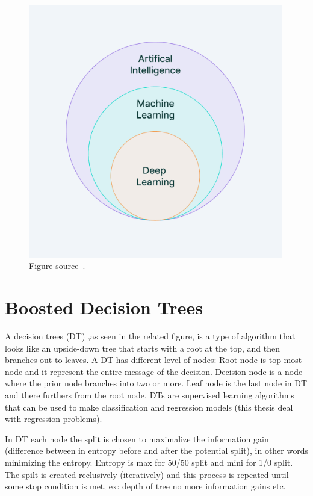 \begin{figure}[t!]
\centering
\includegraphics[width=0.99\textwidth]{figures/ML_diagram.png}
\caption[ML and AI]{Figure source~\cite{SMtable}.}
\label{fig:ML_diagram}
\end{figure}
  
\section{Boosted Decision Trees}
A decision trees (DT) ,as seen in the related figure, is a type of algorithm that looks like an upside-down tree that starts with a root at the top, and then branches out to leaves. A DT has different level of nodes: Root node is top most node and it represent the entire message of the decision. Decision node is a node where the prior node branches into two or more. Leaf node is the last node in DT and there furthers from the root node. DTs are supervised learning algorithms that can be used to make classification and regression models (this thesis deal with regression problems).

In DT each node the split is chosen to maximalize the information gain (difference between in entropy before and after the potential split), in other words minimizing the entropy. Entropy is max for 50/50 split and mini for 1/0 split. The spilt is created reclusively (iteratively) and this process is repeated until some stop condition is met, ex: depth of tree no more information gains etc.

